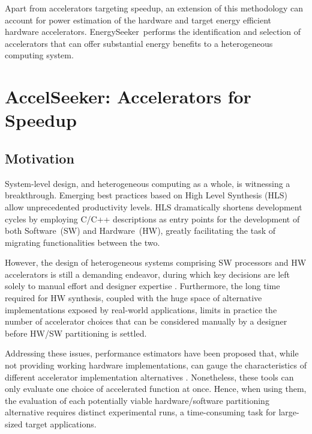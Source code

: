 \documentclass[]{usiinfthesis}
\newcommand{\aseeker}{{AccelSeeker}}
\newcommand{\eseeker}{{EnergySeeker}}
\newcommand{\HW}{{Hardware}}
\newcommand{\SW}{{Software}}
\begin{document}
Apart from accelerators targeting speedup, an extension of this methodology can account for power estimation
of the hardware and target energy efficient hardware accelerators. \eseeker\ performs the identification
and selection of accelerators that can offer substantial energy benefits to a heterogeneous computing 
system.

% 
%
%
%
%

\section{\aseeker: Accelerators for Speedup}

\subsection{Motivation}

System-level design, and heterogeneous computing as a whole, is witnessing a breakthrough. 
Emerging best practices based on High Level Synthesis (HLS) allow unprecedented productivity levels. 
HLS dramatically shortens development cycles by employing C/C++ descriptions as entry points 
for the development of both \SW\ (SW) and \HW\ (HW), greatly facilitating the task of migrating 
functionalities between the two.\par

However, the design of heterogeneous systems comprising SW processors and HW accelerators is 
still a demanding endeavor, during which key decisions are left solely to manual effort and 
designer expertise \cite{CacciottiSep18} \cite{NouriJun17}. Furthermore, the long time required 
for HW synthesis, coupled with the huge space of alternative implementations exposed by real-world 
applications, limits in practice the number of accelerator choices that can be considered manually 
by a designer before HW/SW partitioning is settled.\par

Addressing these issues, performance estimators have been proposed
that, while not providing working hardware implementations, can gauge
the characteristics of different accelerator implementation
alternatives  \cite{ShaoOct16} \cite{KathailFeb16}.  
Nonetheless, these tools can only evaluate one choice of accelerated
function at once. Hence, when using them, the evaluation of each
potentially viable hardware/software partitioning alternative requires
distinct experimental runs, a time-consuming task for large-sized
target applications.\par
\end{document}
